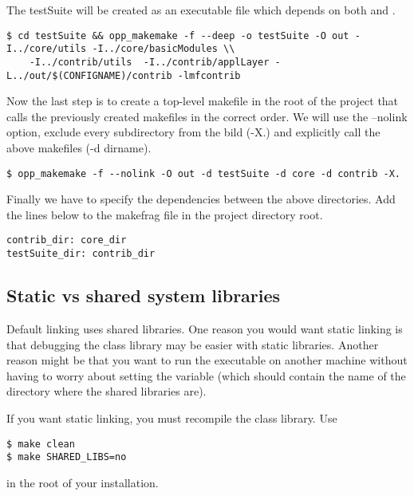 The testSuite will be created as an executable file which depends on both
 and .

\begin{verbatim}
$ cd testSuite && opp_makemake -f --deep -o testSuite -O out -I../core/utils -I../core/basicModules \\
    -I../contrib/utils  -I../contrib/applLayer -L../out/$(CONFIGNAME)/contrib -lmfcontrib
\end{verbatim}

Now the last step is to create a top-level makefile in the root of the project that
calls the previously created makefiles in the correct order. We will use the
--nolink option, exclude every subdirectory from the bild (-X.) and explicitly call
the above makefiles (-d dirname).

\begin{verbatim}
$ opp_makemake -f --nolink -O out -d testSuite -d core -d contrib -X.
\end{verbatim}

Finally we have to specify the dependencies between the above directories. Add the lines below to the makefrag file
in the project directory root.

\begin{verbatim}
contrib_dir: core_dir
testSuite_dir: contrib_dir
\end{verbatim}

\subsection{Static vs shared {\opp} system libraries}

Default linking uses shared libraries. One
reason you would want static linking is that debugging
the {\opp} class library may be easier with static libraries.
Another reason might be that you want to run the executable on
another machine without having to worry about setting the
 variable (which should contain the name
of the directory where the {\opp} shared libraries are).

If you want static linking, you must
recompile the {\opp} class library. Use

\begin{verbatim}
$ make clean
$ make SHARED_LIBS=no
\end{verbatim}

in the root of your {\opp} installation.

